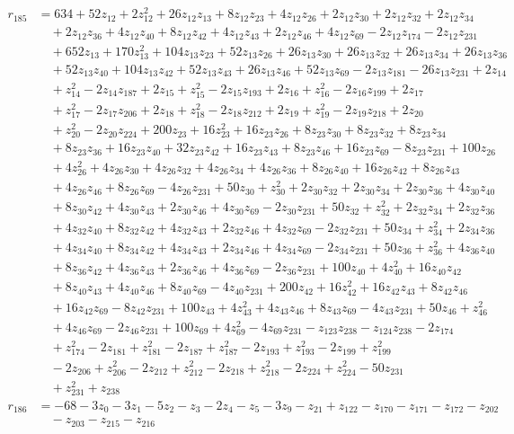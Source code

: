 \begin{align*}
r_{185} &=634+52z_{12}+2z_{12}^{2}+26z_{12}z_{13}+8z_{12}z_{23}+4z_{12}z_{26}+2z_{12}z_{30}+2z_{12}z_{32}+2z_{12}z_{34}\\
&\quad +2z_{12}z_{36}+4z_{12}z_{40}+8z_{12}z_{42}+4z_{12}z_{43}+2z_{12}z_{46}+4z_{12}z_{69}-2z_{12}z_{174}-2z_{12}z_{231}\\
&\quad +652z_{13}+170z_{13}^{2}+104z_{13}z_{23}+52z_{13}z_{26}+26z_{13}z_{30}+26z_{13}z_{32}+26z_{13}z_{34}+26z_{13}z_{36}\\
&\quad +52z_{13}z_{40}+104z_{13}z_{42}+52z_{13}z_{43}+26z_{13}z_{46}+52z_{13}z_{69}-2z_{13}z_{181}-26z_{13}z_{231}+2z_{14}\\
&\quad +z_{14}^{2}-2z_{14}z_{187}+2z_{15}+z_{15}^{2}-2z_{15}z_{193}+2z_{16}+z_{16}^{2}-2z_{16}z_{199}+2z_{17}\\
&\quad +z_{17}^{2}-2z_{17}z_{206}+2z_{18}+z_{18}^{2}-2z_{18}z_{212}+2z_{19}+z_{19}^{2}-2z_{19}z_{218}+2z_{20}\\
&\quad +z_{20}^{2}-2z_{20}z_{224}+200z_{23}+16z_{23}^{2}+16z_{23}z_{26}+8z_{23}z_{30}+8z_{23}z_{32}+8z_{23}z_{34}\\
&\quad +8z_{23}z_{36}+16z_{23}z_{40}+32z_{23}z_{42}+16z_{23}z_{43}+8z_{23}z_{46}+16z_{23}z_{69}-8z_{23}z_{231}+100z_{26}\\
&\quad +4z_{26}^{2}+4z_{26}z_{30}+4z_{26}z_{32}+4z_{26}z_{34}+4z_{26}z_{36}+8z_{26}z_{40}+16z_{26}z_{42}+8z_{26}z_{43}\\
&\quad +4z_{26}z_{46}+8z_{26}z_{69}-4z_{26}z_{231}+50z_{30}+z_{30}^{2}+2z_{30}z_{32}+2z_{30}z_{34}+2z_{30}z_{36}+4z_{30}z_{40}\\
&\quad +8z_{30}z_{42}+4z_{30}z_{43}+2z_{30}z_{46}+4z_{30}z_{69}-2z_{30}z_{231}+50z_{32}+z_{32}^{2}+2z_{32}z_{34}+2z_{32}z_{36}\\
&\quad +4z_{32}z_{40}+8z_{32}z_{42}+4z_{32}z_{43}+2z_{32}z_{46}+4z_{32}z_{69}-2z_{32}z_{231}+50z_{34}+z_{34}^{2}+2z_{34}z_{36}\\
&\quad +4z_{34}z_{40}+8z_{34}z_{42}+4z_{34}z_{43}+2z_{34}z_{46}+4z_{34}z_{69}-2z_{34}z_{231}+50z_{36}+z_{36}^{2}+4z_{36}z_{40}\\
&\quad +8z_{36}z_{42}+4z_{36}z_{43}+2z_{36}z_{46}+4z_{36}z_{69}-2z_{36}z_{231}+100z_{40}+4z_{40}^{2}+16z_{40}z_{42}\\
&\quad +8z_{40}z_{43}+4z_{40}z_{46}+8z_{40}z_{69}-4z_{40}z_{231}+200z_{42}+16z_{42}^{2}+16z_{42}z_{43}+8z_{42}z_{46}\\
&\quad +16z_{42}z_{69}-8z_{42}z_{231}+100z_{43}+4z_{43}^{2}+4z_{43}z_{46}+8z_{43}z_{69}-4z_{43}z_{231}+50z_{46}+z_{46}^{2}\\
&\quad +4z_{46}z_{69}-2z_{46}z_{231}+100z_{69}+4z_{69}^{2}-4z_{69}z_{231}-z_{123}z_{238}-z_{124}z_{238}-2z_{174}\\
&\quad +z_{174}^{2}-2z_{181}+z_{181}^{2}-2z_{187}+z_{187}^{2}-2z_{193}+z_{193}^{2}-2z_{199}+z_{199}^{2}\\
&\quad -2z_{206}+z_{206}^{2}-2z_{212}+z_{212}^{2}-2z_{218}+z_{218}^{2}-2z_{224}+z_{224}^{2}-50z_{231}\\
&\quad +z_{231}^{2}+z_{238}
\end{align*}
\begin{align*}
r_{186} &=-68-3z_{0}-3z_{1}-5z_{2}-z_{3}-2z_{4}-z_{5}-3z_{9}-z_{21}+z_{122}-z_{170}-z_{171}-z_{172}-z_{202}\\
&\quad -z_{203}-z_{215}-z_{216}
\end{align*}
\endgroup

